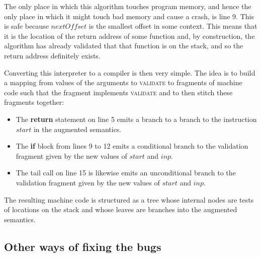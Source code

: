 The only place in which this algorithm touches program memory, and
hence the only place in which it might touch bad memory and cause a
crash, is line 9.  This is safe because $nextOffset$ is the smallest
offset in some context.  This means that it is the location of the
return address of some function and, by construction, the algorithm
has already validated that that function is on the stack, and so the
return address definitely exists.

Converting this interpreter to a compiler is then very simple.  The
idea is to build a mapping from values of the arguments to
\textsc{validate} to fragments of machine code such that the fragment
implements \textsc{validate} and to then stitch these fragments
together:

\begin{itemize}
\item The \textbf{return} statement on line 5 emits a branch to a
  branch to the instruction $start$ in the augmented semantics.
\item The \textbf{if} block from lines 9 to 12 emits a conditional
  branch to the validation fragment given by the new values of $start$
  and $inp$.
\item The tail call on line 15 is likewise emits an unconditional
  branch to the validation fragment given by the new values of $start$
  and $inp$.
\end{itemize}

The resulting machine code is structured as a tree whose internal
nodes are tests of locations on the stack and whose leaves are
branches into the augmented semantics.


\subsection{Other ways of fixing the bugs}



